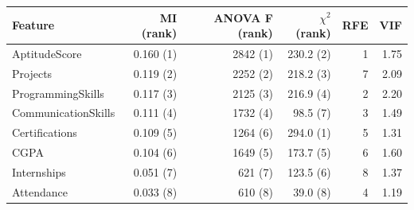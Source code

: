 \footnotesize
\setlength{\tabcolsep}{3pt}
\begin{tabular}{lrrrrr}
\toprule
Feature & MI (rank) & ANOVA F (rank) & $\chi^2$ (rank) & RFE & VIF \\
\midrule
AptitudeScore & 0.160 (1) & 2842 (1) & 230.2 (2) & 1 & 1.75 \\
Projects & 0.119 (2) & 2252 (2) & 218.2 (3) & 7 & 2.09 \\
ProgrammingSkills & 0.117 (3) & 2125 (3) & 216.9 (4) & 2 & 2.20 \\
CommunicationSkills & 0.111 (4) & 1732 (4) & 98.5 (7) & 3 & 1.49 \\
Certifications & 0.109 (5) & 1264 (6) & 294.0 (1) & 5 & 1.31 \\
CGPA & 0.104 (6) & 1649 (5) & 173.7 (5) & 6 & 1.60 \\
Internships & 0.051 (7) & 621 (7) & 123.5 (6) & 8 & 1.37 \\
Attendance & 0.033 (8) & 610 (8) & 39.0 (8) & 4 & 1.19 \\
\bottomrule
\end{tabular}
